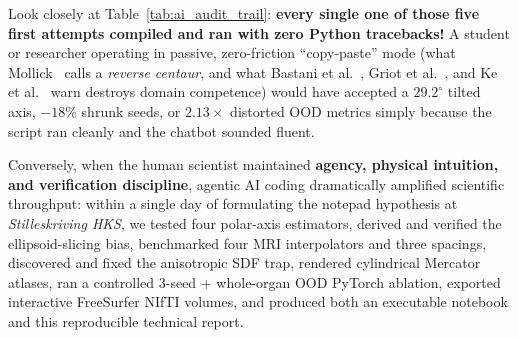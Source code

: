 \documentclass[10pt,a4paper]{article}
\renewcommand{\_}{\origunderscore\allowbreak}
\begin{document}
Look closely at Table~\ref{tab:ai_audit_trail}: \textbf{every single one of those five first attempts compiled and ran with zero Python tracebacks!} A student or researcher operating in passive, zero-friction ``copy-paste'' mode (what Mollick~\cite{mollick2026coexistence} calls a \emph{reverse centaur}, and what Bastani et al.~\cite{bastani2025pnas}, Griot et al.~\cite{griot2025metacognition}, and Ke et al.~\cite{ke2026neverskilling} warn destroys domain competence) would have accepted a $29.2^\circ$ tilted axis, $-18\%$ shrunk seeds, or $2.13\times$ distorted OOD metrics simply because the script ran cleanly and the chatbot sounded fluent.

Conversely, when the human scientist maintained \textbf{agency, physical intuition, and verification discipline}, agentic AI coding dramatically amplified scientific throughput: within a single day of formulating the notepad hypothesis at \textit{Stilleskriving HKS}, we tested four polar-axis estimators, derived and verified the ellipsoid-slicing bias, benchmarked four MRI interpolators and three spacings, discovered and fixed the anisotropic SDF trap, rendered cylindrical Mercator atlases, ran a controlled $3$-seed + whole-organ OOD PyTorch ablation, exported interactive FreeSurfer NIfTI volumes, and produced both an executable notebook and this reproducible technical report.
\end{document}
